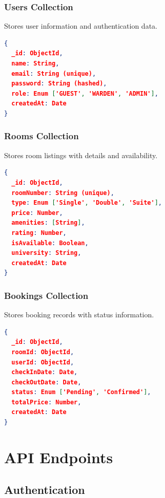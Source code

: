 \documentclass[12pt, a4paper, oneside]{report}
\begin{document}
\subsection{Users Collection}

Stores user information and authentication data.

\begin{lstlisting}[language=json]
{
  _id: ObjectId,
  name: String,
  email: String (unique),
  password: String (hashed),
  role: Enum ['GUEST', 'WARDEN', 'ADMIN'],
  createdAt: Date
}
\end{lstlisting}

\subsection{Rooms Collection}

Stores room listings with details and availability.

\begin{lstlisting}[language=json]
{
  _id: ObjectId,
  roomNumber: String (unique),
  type: Enum ['Single', 'Double', 'Suite'],
  price: Number,
  amenities: [String],
  rating: Number,
  isAvailable: Boolean,
  university: String,
  createdAt: Date
}
\end{lstlisting}

\subsection{Bookings Collection}

Stores booking records with status information.

\begin{lstlisting}[language=json]
{
  _id: ObjectId,
  roomId: ObjectId,
  userId: ObjectId,
  checkInDate: Date,
  checkOutDate: Date,
  status: Enum ['Pending', 'Confirmed'],
  totalPrice: Number,
  createdAt: Date
}
\end{lstlisting}

\chapter{API Endpoints}

\section{Authentication}
\end{document}
